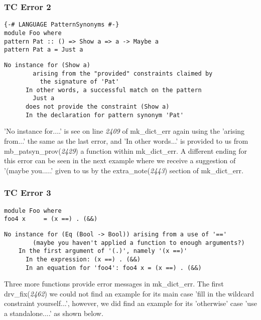 \documentclass[a4paper]{article}
\begin{document}
\subsubsection{TC Error 2}

\begin{lstlisting}[label={lst: T16.0}, numbers=none, caption={Example Program \cite{ex16}}]
{-# LANGUAGE PatternSynonyms #-}
module Foo where
pattern Pat :: () => Show a => a -> Maybe a
pattern Pat a = Just a
\end{lstlisting}


\begin{lstlisting}[label={lst: T16.0.2}, numbers=none, caption={Error}]
No instance for (Show a)
        arising from the "provided" constraints claimed by
          the signature of 'Pat'
      In other words, a successful match on the pattern
        Just a
      does not provide the constraint (Show a)
      In the declaration for pattern synonym 'Pat'
\end{lstlisting}

'No instance for....' is see on line \textit{2409} of mk\_dict\_err again using the 'arising from...' the same as the last error, and 'In other words...' is provided to us from mb\_patsyn\_prov(\textit{2429}) a function within mk\_dict\_err. A different ending for this error can be seen in the next example where we receive a suggestion of '(maybe you.....' given to us by the extra\_note(\textit{2443}) section of mk\_dict\_err.


\subsubsection{TC Error 3}

\begin{lstlisting}[label={lst: T17.0}, numbers=none, caption={Example Program \cite{ex17}}]
module Foo where
foo4 x     = (x ==) . (&&) 
\end{lstlisting}


\begin{lstlisting}[label={lst: T17.0.2}, numbers=none, caption={Error}]
    No instance for (Eq (Bool -> Bool)) arising from a use of '=='
        (maybe you haven't applied a function to enough arguments?)
    In the first argument of '(.)', namely '(x ==)'
      In the expression: (x ==) . (&&)
      In an equation for 'foo4': foo4 x = (x ==) . (&&)
\end{lstlisting}

Three more functions provide error messages in  mk\_dict\_err. The first drv\_fix(\textit{2462}) we could not find an example for its main case 'fill in the wildcard constraint yourself...', however, we did find an example for its 'otherwise' case 'use a standalone....' as shown below.
\end{document}
